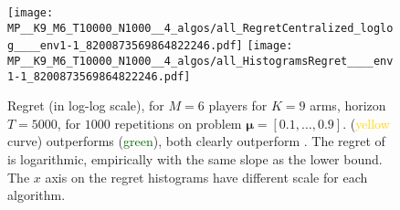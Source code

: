 

\begin{figure}[!b]
  \centering
    \texttt{[image: MP\_\_K9\_M6\_T10000\_N1000\_\_4\_algos/all\_RegretCentralized\_loglog\_\_\_\_env1-1\_8200873569864822246.pdf]}
    \texttt{[image: MP\_\_K9\_M6\_T10000\_N1000\_\_4\_algos/all\_HistogramsRegret\_\_\_\_env1-1\_8200873569864822246.pdf]}
  \caption[Regret for $M=6$ players for $K=9$ arms, horizon $T=5000$, for $1000$ repetitions on a fixed problem]{Regret (in log-log scale), for $M=6$ players for $K=9$ arms, horizon $T=5000$, for $1000$ repetitions on problem $\boldsymbol{\mu}=[0.1,\dots,0.9]$. \RandTopM{} (\textcolor{gold}{yellow} curve) outperforms \Selfish{} (\textcolor{darkgreen}{green}), both clearly outperform \rhoRand. The regret of \MCTopM{} is logarithmic, empirically with the same slope as the lower bound. The $x$ axis on the regret histograms have different scale for each algorithm.}
  \label{fig:5:MP__K9_M6_T10000_N1000__4_algos}
\end{figure}


